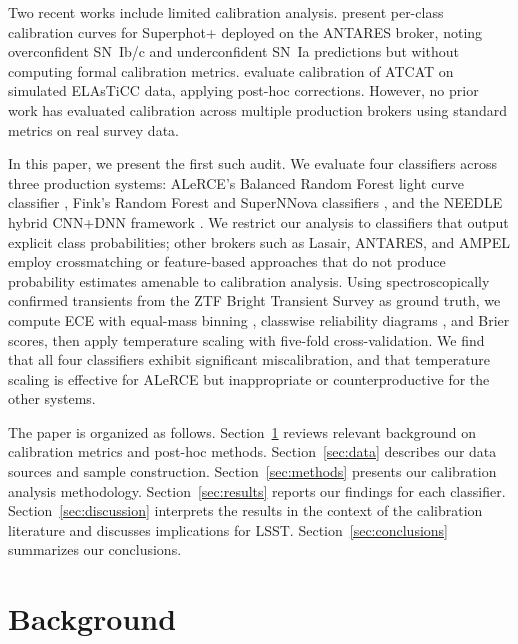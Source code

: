 \documentclass[twocolumn]{aastex631}
\begin{document}
Two recent works include limited calibration analysis. \citet{desoto2024} present per-class calibration curves for Superphot+ deployed on the ANTARES broker, noting overconfident SN~Ib/c and underconfident SN~Ia predictions but without computing formal calibration metrics. \citet{tung2025} evaluate calibration of ATCAT on simulated ELAsTiCC data, applying post-hoc corrections. However, no prior work has evaluated calibration across multiple production brokers using standard metrics on real survey data.

In this paper, we present the first such audit. We evaluate four classifiers across three production systems: ALeRCE's Balanced Random Forest light curve classifier \citep[lc\_classifier v1.1.13;][]{sanchezsaez2021}, Fink's Random Forest and SuperNNova classifiers \citep{leoni2022, moller2020}, and the NEEDLE hybrid CNN+DNN framework \citep{sheng2024}. We restrict our analysis to classifiers that output explicit class probabilities; other brokers such as Lasair, ANTARES, and AMPEL employ crossmatching or feature-based approaches that do not produce probability estimates amenable to calibration analysis. Using spectroscopically confirmed transients from the ZTF Bright Transient Survey \citep[BTS;][]{fremling2020, perley2020} as ground truth, we compute ECE with equal-mass binning \citep{roelofs2022}, classwise reliability diagrams \citep{nixon2019}, and Brier scores, then apply temperature scaling with five-fold cross-validation. We find that all four classifiers exhibit significant miscalibration, and that temperature scaling is effective for ALeRCE but inappropriate or counterproductive for the other systems.

The paper is organized as follows. Section~\ref{sec:background} reviews relevant background on calibration metrics and post-hoc methods. Section~\ref{sec:data} describes our data sources and sample construction. Section~\ref{sec:methods} presents our calibration analysis methodology. Section~\ref{sec:results} reports our findings for each classifier. Section~\ref{sec:discussion} interprets the results in the context of the calibration literature and discusses implications for LSST. Section~\ref{sec:conclusions} summarizes our conclusions.


\section{Background} \label{sec:background}
\end{document}
